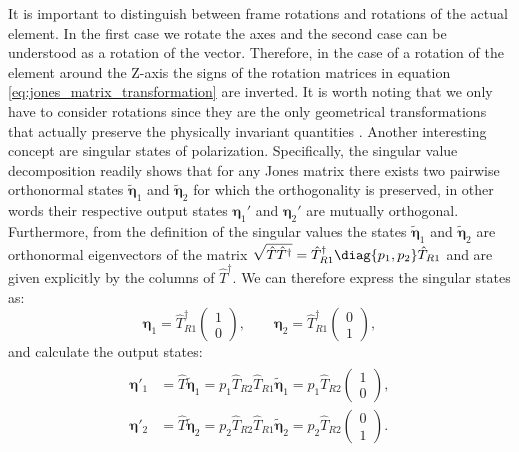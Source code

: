 It is important to distinguish between frame rotations and rotations of the actual element. In the first case we rotate the axes and the second case can be understood as a rotation of the vector. Therefore, in the case of a rotation of the element around the Z-axis the signs of the rotation matrices in equation \ref{eq:jones_matrix_transformation} are inverted. It is worth noting that we only have to consider rotations since they are the only geometrical transformations that actually preserve the physically invariant quantities \cite{GilPerez2017}. Another interesting concept are singular states of polarization. Specifically, the singular value decomposition readily shows that for any Jones matrix there exists two pairwise orthonormal states $\tilde{\bm{\eta}}_1$ and $\tilde{\bm{\eta}}_2$ for which the orthogonality is preserved, in other words their respective output states $\bm{\eta}_1'$ and $\bm{\eta}_2'$ are mutually orthogonal. Furthermore, from the definition of the singular values the states $\tilde{\bm{\eta}}_1$ and $\tilde{\bm{\eta}}_2$ are orthonormal eigenvectors of the matrix $\sqrt{\hat{T}\hat{T}^{\dagger}}=\hat{T}_{R1}^{\dagger}\diag{p_1, p_2}\hat{T}_{R1}$ and are given explicitly by the columns of $\hat{T}^{\dagger}$. We can therefore express the singular states as:
\begin{equation}
    \bm{\eta}_1 = \hat{T}^{\dagger}_{R1}\begin{pmatrix} 1 \\ 0 \end{pmatrix}, \qquad
    \bm{\eta}_2 = \hat{T}^{\dagger}_{R1}\begin{pmatrix} 0 \\ 1 \end{pmatrix},
\end{equation}
and calculate the output states:
\begin{align}
\begin{split}
    \bm{\eta}'_1 &= \hat{T}\tilde{\bm{\eta}}_1 = 
    p_1\hat{T}_{R2}\hat{T}_{R1}\tilde{\bm{\eta}}_1 =
    p_1\hat{T}_{R2}\begin{pmatrix} 1 \\ 0 \end{pmatrix}, \\
    \bm{\eta}'_2 &= \hat{T}\tilde{\bm{\eta}}_2 = 
    p_2\hat{T}_{R2}\hat{T}_{R1}\tilde{\bm{\eta}}_2 =
    p_2\hat{T}_{R2}\begin{pmatrix} 0 \\ 1 \end{pmatrix}.
\end{split}
\end{align}

